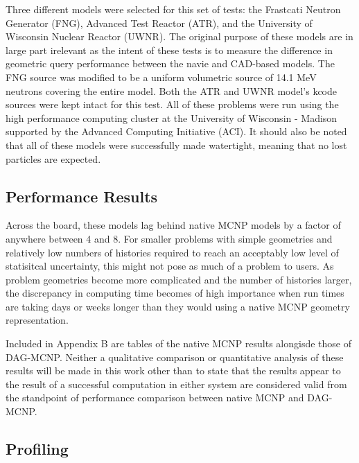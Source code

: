 \documentclass[12pt, a4paper]{article}
\begin{document}
Three different models were selected for this set of tests: the Frastcati Neutron Generator (FNG), Advanced Test Reactor (ATR), and the University of Wisconsin Nuclear Reactor (UWNR). The original purpose of these models are in large part irelevant as the intent of these tests is to measure the difference in geometric query performance between the navie and CAD-based models. The FNG source was modified to be a uniform volumetric source of 14.1 MeV neutrons covering the entire model. Both the ATR and UWNR model's kcode sources were kept intact for this test. All of these problems were run using the high performance computing cluster at the University of Wisconsin - Madison supported by the Advanced Computing Initiative (ACI). It should also be noted that all of these models were successfully made watertight, meaning that no lost particles are expected.

\subsection{Performance Results}%

Across the board, these models lag behind native MCNP models by a factor of anywhere between 4 and 8. For smaller problems with simple geometries and relatively low numbers of histories required to reach an acceptably low level of statisitcal uncertainty, this might not pose as much of a problem to users. As problem geometries become more complicated and the number of histories larger, the discrepancy in computing time becomes of high importance when run times are taking days or weeks longer than they would using a native MCNP geometry representation.

Included in Appendix B are tables of the native MCNP results alongisde those of DAG-MCNP. Neither a qualitative comparison or quantitative analysis of these results will be made in this work other than to state that the results appear to the result of a successful computation in either system are considered valid from the standpoint of performance comparison between native MCNP and DAG-MCNP.

\subsection{Profiling}%
\end{document}
